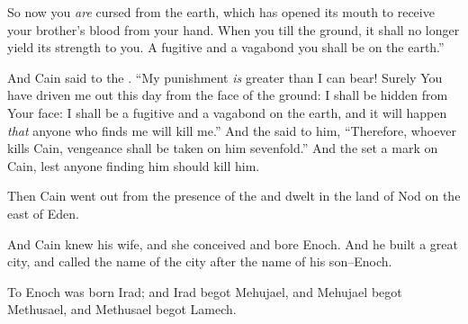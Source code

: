 \bverse So now you \textit{are} cursed from the earth, which has opened its mouth to receive your brother's blood from your hand.
\bverse When you till the ground, it shall no longer yield its strength to you. A fugitive and a vagabond you shall be on the earth.''
	
\bverse And Cain said to the \lord. ``My punishment \textit{is} greater than I can bear!
\bverse Surely You have driven me out this day from the face of the ground: I shall be hidden from Your face: I shall be a fugitive and a vagabond on the earth, and it will happen \textit{that} anyone who finds me will kill me.''
\bverse And the \lord said to him, ``Therefore, whoever kills Cain, vengeance shall be taken on him sevenfold.'' And the \lord set a mark on Cain, lest anyone finding him should kill him.


\bverse Then Cain went out from the presence of the \lord and dwelt in the land of Nod on the east of Eden.

\bverse And Cain knew his wife, and she conceived and bore Enoch. And he built a great city, and called the name of the city after the name of his son--Enoch.
	
\bverse To Enoch was born Irad; and Irad begot Mehujael, and Mehujael begot Methusael, and Methusael begot Lamech.

\bverse 
\bverse 
\bverse 
\bverse 
\bverse 
\bverse 
\bverse 
\bverse 
